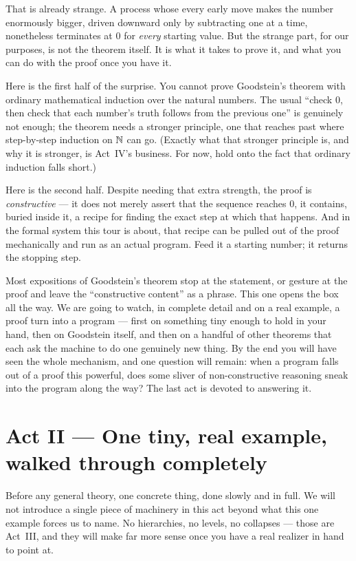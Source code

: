 \documentclass[11pt]{article}
\begin{document}
That is already strange. A process whose every early move makes the number
enormously bigger, driven downward only by subtracting one at a time,
nonetheless terminates at $0$ for \emph{every} starting value. But the
strange part, for our purposes, is not the theorem itself. It is what it
takes to prove it, and what you can do with the proof once you have it.

Here is the first half of the surprise. You cannot prove Goodstein's theorem
with ordinary mathematical induction over the natural numbers. The usual
``check $0$, then check that each number's truth follows from the previous
one'' is genuinely not enough; the theorem needs a stronger principle, one
that reaches past where step-by-step induction on $\mathbb{N}$ can go. (Exactly
what that stronger principle is, and why it is stronger, is Act~IV's
business. For now, hold onto the fact that ordinary induction falls short.)

Here is the second half. Despite needing that extra strength, the proof is
\emph{constructive} --- it does not merely assert that the sequence reaches
$0$, it contains, buried inside it, a recipe for finding the exact step at
which that happens. And in the formal system this tour is about, that recipe
can be pulled out of the proof mechanically and run as an actual program.
Feed it a starting number; it returns the stopping step.

Most expositions of Goodstein's theorem stop at the statement, or gesture at
the proof and leave the ``constructive content'' as a phrase. This one opens
the box all the way. We are going to watch, in complete detail and on a real
example, a proof turn into a program --- first on something tiny enough to
hold in your hand, then on Goodstein itself, and then on a handful of other
theorems that each ask the machine to do one genuinely new thing. By the end
you will have seen the whole mechanism, and one question will remain: when a
program falls out of a proof this powerful, does some sliver of
non-constructive reasoning sneak into the program along the way? The last act
is devoted to answering it.

\section{Act II --- One tiny, real example, walked through completely}

Before any general theory, one concrete thing, done slowly and in full. We
will not introduce a single piece of machinery in this act beyond what this
one example forces us to name. No hierarchies, no levels, no collapses ---
those are Act~III, and they will make far more sense once you have a real
realizer in hand to point at.
\end{document}
